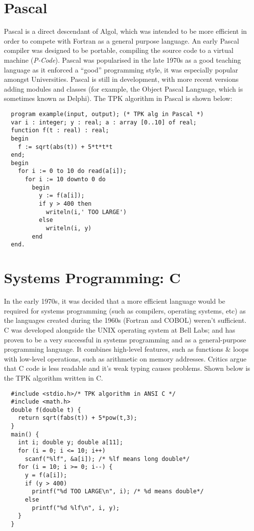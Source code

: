 \section{Pascal}
Pascal is a direct descendant of Algol, which was intended to be more efficient in order to compete with Fortran as a general purpose language. An early Pascal compiler was designed to be portable, compiling the source code to a virtual machine (\textit{P-Code}). Pascal was popularised in the late 1970s as a good teaching language as it enforced a ``good'' programming style, it was especially popular amongst Universities. Pascal is still in development, with more recent versions adding modules and classes (for example, the Object Pascal Language, which is sometimes known as Delphi). The TPK algorithm in Pascal is shown below:
\begin{verbatim}
  program example(input, output); (* TPK alg in Pascal *)
  var i : integer; y : real; a : array [0..10] of real;
  function f(t : real) : real;
  begin
    f := sqrt(abs(t)) + 5*t*t*t
  end;
  begin
    for i := 0 to 10 do read(a[i]);
      for i := 10 downto 0 do
        begin
          y := f(a[i]);
          if y > 400 then
            writeln(i,' TOO LARGE')
          else
            writeln(i, y)
        end
  end.
\end{verbatim}

\section{Systems Programming: C}
In the early 1970s, it was decided that a more efficient language would be required for systems programming (such as compilers, operating systems, etc) as the languages created during the 1960s (Fortran and COBOL) weren't sufficient. C was developed alongside the UNIX operating system at Bell Labs; and has proven to be a very successful in systems programming and as a general-purpose programming language. It combines high-level features, such as functions \& loops with low-level operations, such as arithmetic on memory addresses. Critics argue that C code is less readable and it's weak typing causes problems. Shown below is the TPK algorithm written in C.
\begin{verbatim}
  #include <stdio.h>/* TPK algorithm in ANSI C */
  #include <math.h>
  double f(double t) {
    return sqrt(fabs(t)) + 5*pow(t,3);
  }
  main() {
    int i; double y; double a[11];
    for (i = 0; i <= 10; i++)
      scanf("%lf", &a[i]); /* %lf means long double*/
    for (i = 10; i >= 0; i--) {
      y = f(a[i]);
      if (y > 400)
        printf("%d TOO LARGE\n", i); /* %d means double*/
      else
        printf("%d %lf\n", i, y);
    }
  }
\end{verbatim}


